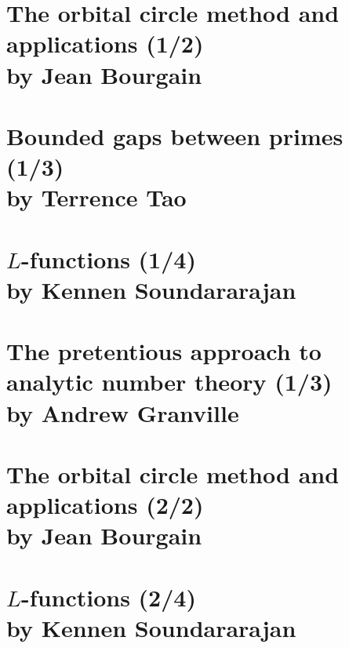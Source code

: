 \documentclass[12pt,amsfont]{amsart}
\begin{document}
\maketitle

\setcounter{tocdepth}{1}
\tableofcontents

\newpage
\section{The orbital circle method and applications (1/2)\\by Jean Bourgain}\label{1}

\begingroup
\renewcommand{\addcontentsline}[3]{}%
\endgroup


\newpage
\renewcommand{\thesubsection}{\arabic{section}.\arabic{subsection}}
\section{Bounded gaps between primes (1/3)\\ by Terrence Tao}\label{2}


\newpage
\renewcommand{\thesubsection}{\arabic{section}.\arabic{subsection}}
\section{$L$-functions (1/4)\\ by Kennen Soundararajan}\label{3}

\newpage
\renewcommand{\thesubsection}{\arabic{section}.\arabic{subsection}}
\section{The pretentious approach to analytic number theory (1/3)\\ by Andrew Granville}\label{4}


\newpage
\section{The orbital circle method and applications (2/2)\\ by Jean Bourgain }\label{1}

\begingroup
\renewcommand{\addcontentsline}[3]{}%
\endgroup


\newpage
\renewcommand{\thesubsection}{\arabic{section}.\arabic{subsection}}
\section{$L$-functions (2/4)\\by Kennen Soundararajan}\label{2}
\end{document}
